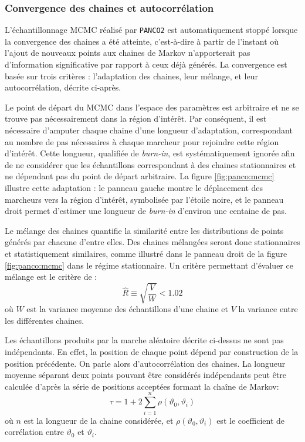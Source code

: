 \subsubsection{Convergence des chaines et autocorrélation} %
L'échantillonnage MCMC réalisé par \texttt{PANCO2} est automatiquement stoppé lorsque la convergence des chaines a été atteinte, c'est-à-dire à partir de l'instant où l'ajout de nouveaux points aux chaines de Markov n'apporterait pas d'information significative par rapport à ceux déjà générés.
La convergence est basée sur trois critères : l'adaptation des chaines, leur mélange, et leur autocorrélation, décrite ci-après.

Le point de départ du MCMC dans l'espace des paramètres est arbitraire et ne se trouve pas nécessairement dans la région d'intérêt.
Par conséquent, il est nécessaire d'amputer chaque chaine d'une longueur d'adaptation, correspondant au nombre de pas nécessaires à chaque marcheur pour rejoindre cette région d'intérêt.
Cette longueur, qualifiée de \textit{burn-in}, est systématiquement ignorée afin de ne considérer que les échantillons correspondant à des chaines stationnaires et ne dépendant pas du point de départ arbitraire.
La figure \ref{fig:panco:mcmc} illustre cette adaptation : le panneau gauche montre le déplacement des marcheurs vers la région d'intérêt, symbolisée par l'étoile noire, et le panneau droit permet d'estimer une longueur de \textit{burn-in} d'environ une centaine de pas.

Le mélange des chaines quantifie la similarité entre les distributions de points générés par chacune d'entre elles.
Des chaines mélangées seront donc stationnaires et statistiquement similaires, comme illustré dans le panneau droit de la figure \ref{fig:panco:mcmc} dans le régime stationnaire.
Un critère permettant d'évaluer ce mélange est le critère de :
\begin{equation}
    \label{eq:panco:rhat}
    \hat{R} \equiv \sqrt{\frac{V}{W}} < 1.02
\end{equation}
où $W$ est la variance moyenne des échantillons d'une chaine et $V$ la variance entre les différentes chaines.

Les échantillons produits par la marche aléatoire décrite ci-dessus ne sont pas indépendants.
En effet, la position de chaque point dépend par construction de la position précédente.
On parle alors d'autocorrélation des chaines.
La longueur moyenne séparant deux points pouvant être considérés indépendants peut être calculée d'après la série de positions acceptées formant la chaîne de Markov:
\begin{equation}
    \tau = 1 + 2 \sum_{i=1}^{n} \rho(\vartheta_0, \vartheta_i)
\end{equation}
où $n$ est la longueur de la chaine considérée, et $\rho(\vartheta_0, \vartheta_i)$ est le coefficient de corrélation entre $\vartheta_0$ et $\vartheta_i$.

